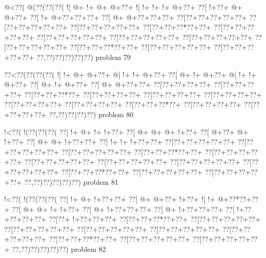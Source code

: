 \vbox{\vbox{\goo
\- @<\0??(\- @(\0??(\0??(\0??(
\- ![\- @+\- !+\- @+\- @+\0??+
\- ![\- !+\- !+\- !+\- @+\0??+
\0??[\- !+\0??+\- @+\- @+\0??+
\0??[\- !+\- @+\0??+\0??+\0??+
\0??[\- @+\- @+\0??+\0??+\0??+
\0??[\0??+\0??+\0??+\0??+\0??+
\0??[\0??+\0??+\0??+\0??+\0??+
\0??[\0??+\0??+\0??+\0??+\0??+
\0??[\0??+\0??+\0??*\0??+\0??+
\0??[\0??+\0??+\0??+\0??+\0??+
\0??[\0??+\0??+\0??+\0??+\0??+
\0??[\0??+\0??+\0??+\0??+\0??+
\0??[\0??+\0??+\0??+\0??+\0??+
\0??[\0??+\0??+\0??+\0??+\0??+
\0??[\0??+\0??+\0??*\0??+\0??+
\0??[\0??+\0??+\0??+\0??+\0??+
\0??[\0??+\0??+\0??+\0??+\0??+
\0??,\0??)\0??)\0??)\0??)\0??)
}
\hfil problem 79\hfil\break
}

\vbox{\vbox{\goo
\0??<\0??(\0??(\0??(\0??(
\- ![\- !+\- @+\- @+\0??+
\- @[\- !+\- !+\- @+\0??+
\0??[\- @+\- !+\- @+\0??+
\- @[\- !+\- !+\- @+\0??+
\0??[\- @+\- !+\- @+\0??+
\0??[\- @+\- @+\0??+\0??+
\0??[\0??+\0??+\0??+\0??+
\0??[\0??+\0??+\0??+\0??+
\0??[\0??+\0??+\0??*\0??+
\0??[\0??+\0??+\0??+\0??+
\0??[\0??+\0??+\0??+\0??+
\0??[\0??+\0??+\0??+\0??+
\0??[\0??+\0??+\0??+\0??+
\0??[\0??+\0??+\0??+\0??+
\0??[\0??+\0??+\0??*\0??+
\0??[\0??+\0??+\0??+\0??+
\0??[\0??+\0??+\0??+\0??+
\0??,\0??)\0??)\0??)\0??)
}
\hfil problem 80\hfil\break
}

\vbox{\vbox{\goo
\- !<\0??(\- !(\0??(\0??(\0??(
\0??[\- !+\- @+\- !+\- !+\0??+
\0??[\- @+\- @+\- @+\- !+\0??+
\0??[\- @+\0??+\- @+\- !+\0??+
\0??[\- @+\- @+\- !+\0??+\0??+
\0??[\- !+\- !+\- !+\0??+\0??+
\0??[\0??+\0??+\0??+\0??+\0??+
\0??[\0??+\0??+\0??+\0??+\0??+
\0??[\0??+\0??+\0??+\0??+\0??+
\0??[\0??+\0??+\0??*\0??+\0??+
\0??[\0??+\0??+\0??+\0??+\0??+
\0??[\0??+\0??+\0??+\0??+\0??+
\0??[\0??+\0??+\0??+\0??+\0??+
\0??[\0??+\0??+\0??+\0??+\0??+
\0??[\0??+\0??+\0??+\0??+\0??+
\0??[\0??+\0??+\0??*\0??+\0??+
\0??[\0??+\0??+\0??+\0??+\0??+
\0??[\0??+\0??+\0??+\0??+\0??+
\0??,\0??)\0??)\0??)\0??)\0??)
}
\hfil problem 81\hfil\break
}

\vbox{\vbox{\goo
\- !<\0??(\- !(\0??(\0??(\0??(
\0??[\- !+\- @+\- !+\0??+\0??+
\0??[\- @+\- @+\0??+\- !+\0??+
\- ![\- !+\- @+\0??*\0??+\0??+
\0??[\- @+\- @+\- !+\- !+\0??+
\0??[\- @+\- !+\0??+\0??+\0??+
\0??[\- @+\- !+\0??+\0??+\0??+
\0??[\- !+\0??+\0??+\0??+\0??+
\0??[\0??+\- !+\0??+\0??+\0??+
\0??[\0??+\0??+\0??*\0??+\0??+
\0??[\0??+\0??+\0??+\0??+\0??+
\0??[\0??+\0??+\0??+\0??+\0??+
\0??[\0??+\0??+\0??+\0??+\0??+
\0??[\0??+\0??+\0??+\0??+\0??+
\0??[\0??+\0??+\0??+\0??+\0??+
\0??[\0??+\0??+\0??*\0??+\0??+
\0??[\0??+\0??+\0??+\0??+\0??+
\0??[\0??+\0??+\0??+\0??+\0??+
\0??,\0??)\0??)\0??)\0??)\0??)
}
\hfil problem 82\hfil\break
}

